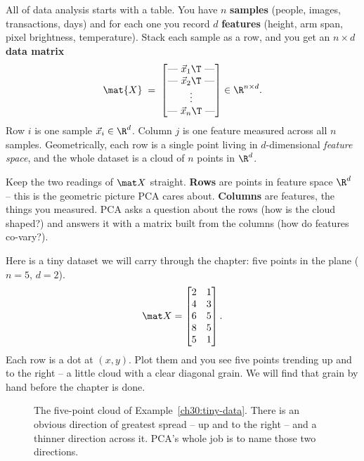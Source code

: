 All of data analysis starts with a table. You have $n$ \textbf{samples} (people,
images, transactions, days) and for each one you record $d$ \textbf{features}
(height, arm span, pixel brightness, temperature). Stack each sample as a row, and
you get an $n\times d$ \textbf{data matrix}
\[
  \mat{X} \;=\;
  \begin{bmatrix}
    \text{---}\ \vec x_1\T\ \text{---}\\
    \text{---}\ \vec x_2\T\ \text{---}\\
    \vdots\\
    \text{---}\ \vec x_n\T\ \text{---}
  \end{bmatrix}
  \in\R^{n\times d}.
\]
Row $i$ is one sample $\vec x_i\in\R^d$. Column $j$ is one feature measured across
all $n$ samples. Geometrically, each row is a single point living in
$d$-dimensional \emph{feature space}, and the whole dataset is a cloud of $n$
points in $\R^d$.

\begin{focusbox}
Keep the two readings of $\mat X$ straight. \textbf{Rows} are points in feature
space $\R^d$ -- this is the geometric picture PCA cares about. \textbf{Columns}
are features, the things you measured. PCA asks a question about the rows (how is
the cloud shaped?) and answers it with a matrix built from the columns (how do
features co-vary?).
\end{focusbox}

\begin{example}\label{ch30:tiny-data}
Here is a tiny dataset we will carry through the chapter: five points in the plane
($n=5$, $d=2$).
\[
  \mat X =
  \begin{bmatrix}
    2 & 1\\
    4 & 3\\
    6 & 5\\
    8 & 5\\
    5 & 1
  \end{bmatrix}.
\]
Each row is a dot at $(x,y)$. Plot them and you see five points trending up and to
the right -- a little cloud with a clear diagonal grain. We will find that grain by
hand before the chapter is done.
\end{example}

\begin{figure}[H]
\centering
{}
\caption{The five-point cloud of Example~\ref{ch30:tiny-data}. There is an obvious
direction of greatest spread -- up and to the right -- and a thinner direction
across it. PCA's whole job is to name those two directions.}
\label{ch30:cloud}
\end{figure}

